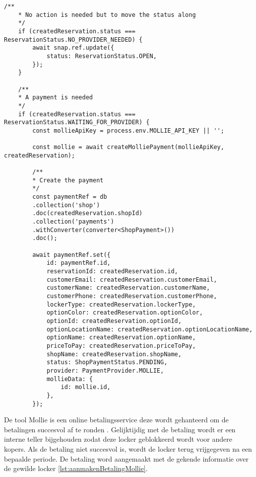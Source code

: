 \begin{lstlisting}[caption={Valideerd of er een betaling van toepassing is. Indien nodig creëert het een betaling en bewaard deze in de databank}, label={lst:aanmakenBetaling}]
    /**
    * No action is needed but to move the status along
    */
    if (createdReservation.status === ReservationStatus.NO_PROVIDER_NEEDED) {
        await snap.ref.update({
            status: ReservationStatus.OPEN,
        });
    }
    
    /**
    * A payment is needed
    */
    if (createdReservation.status === ReservationStatus.WAITING_FOR_PROVIDER) {
        const mollieApiKey = process.env.MOLLIE_API_KEY || '';
        
        const mollie = await createMolliePayment(mollieApiKey, createdReservation);
        
        /**
        * Create the payment
        */
        const paymentRef = db
        .collection('shop')
        .doc(createdReservation.shopId)
        .collection('payments')
        .withConverter(converter<ShopPayment>())
        .doc();
        
        await paymentRef.set({
            id: paymentRef.id,
            reservationId: createdReservation.id,
            customerEmail: createdReservation.customerEmail,
            customerName: createdReservation.customerName,
            customerPhone: createdReservation.customerPhone,
            lockerType: createdReservation.lockerType,
            optionColor: createdReservation.optionColor,
            optionId: createdReservation.optionId,
            optionLocationName: createdReservation.optionLocationName,
            optionName: createdReservation.optionName,
            priceToPay: createdReservation.priceToPay,
            shopName: createdReservation.shopName,
            status: ShopPaymentStatus.PENDING,
            provider: PaymentProvider.MOLLIE,
            mollieData: {
                id: mollie.id,
            },
        });
\end{lstlisting}

De tool Mollie is een online betalingsservice deze wordt gehanteerd om de betalingen succesvol af te ronden \autocite{docs2023}. Gelijktijdig met de betaling wordt er een interne teller bijgehouden zodat deze locker geblokkeerd wordt voor andere kopers. Als de betaling niet succesvol is, wordt de locker terug vrijgegeven na een bepaalde periode. De betaling word aangemaakt met de gekende informatie over de gewilde locker \ref{lst:aanmakenBetalingMollie}.


